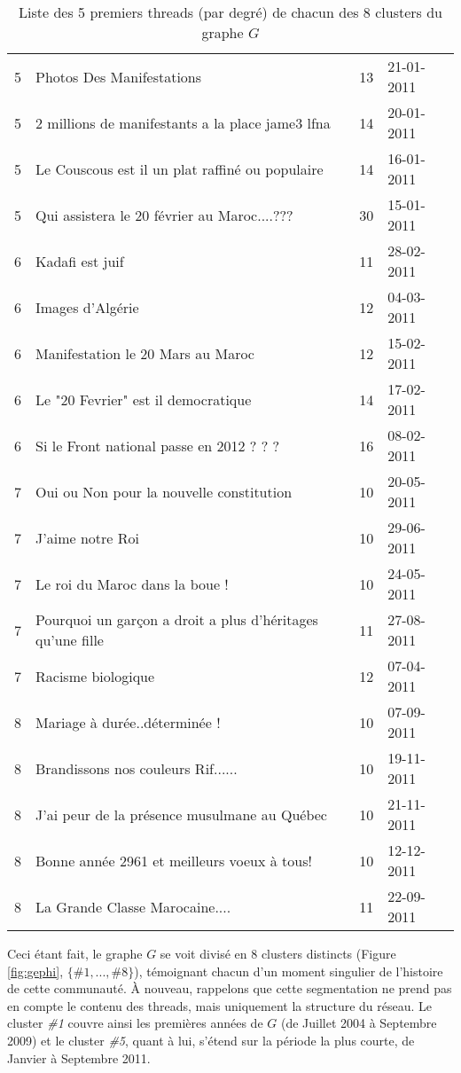 \documentclass[symmetric,justified,marginals=raggedouter]{tufte-book}
\begin{document}
\begin{table*}
\begin{tabular}{clcl}
	5&Photos Des Manifestations&13&21-01-2011\\
	5&2 millions de manifestants a la place jame3 lfna&14&20-01-2011\\
	5&Le Couscous est il un plat raffiné ou populaire&14&16-01-2011\\
	5&Qui assistera le 20 février au Maroc....???&30&15-01-2011\\
    \midrule 
	6&Kadafi est juif&11&28-02-2011\\
	6&Images d'Algérie&12&04-03-2011\\
	6&Manifestation le 20 Mars au Maroc&12&15-02-2011\\
	6&Le "20 Fevrier" est il democratique&14&17-02-2011\\
	6&Si le Front national passe en 2012 ? ? ?&16&08-02-2011\\
    \midrule 	
	7&Oui ou Non pour la nouvelle constitution&10&20-05-2011\\
	7&J'aime notre Roi&10&29-06-2011\\
	7&Le roi du Maroc dans la boue !&10&24-05-2011\\
	7&Pourquoi un garçon a droit a plus d'héritages qu'une fille&11&27-08-2011\\
	7&Racisme biologique&12&07-04-2011\\
    \midrule 	
	8&Mariage à durée..déterminée !&10&07-09-2011\\
	8&Brandissons nos couleurs Rif......&10&19-11-2011\\
	8&J'ai peur de la présence musulmane au Québec&10&21-11-2011\\
	8&Bonne année 2961 et meilleurs voeux à tous!&10&12-12-2011\\
	8&La Grande Classe Marocaine....&11&22-09-2011\\  
  \bottomrule
  \end{tabular}
  \bigskip
  \caption{Liste des 5 premiers threads (par degré) de chacun des 8 clusters du graphe $G$}
\end{table*} 

Ceci étant fait, le graphe $G$ se voit divisé en 8 clusters distincts (Figure \ref{fig:gephi}, $\{\#1,...,\#8\}$), témoignant chacun d'un moment singulier de l'histoire de cette communauté. À nouveau, rappelons que cette segmentation ne prend pas en compte le contenu des threads, mais uniquement la structure du réseau. Le cluster \textit{\#1} couvre ainsi les premières années de $G$ (de Juillet 2004 à Septembre 2009) et le cluster \textit{\#5}, quant à lui, s'étend sur la période la plus courte, de Janvier à Septembre 2011. 
\end{document}

